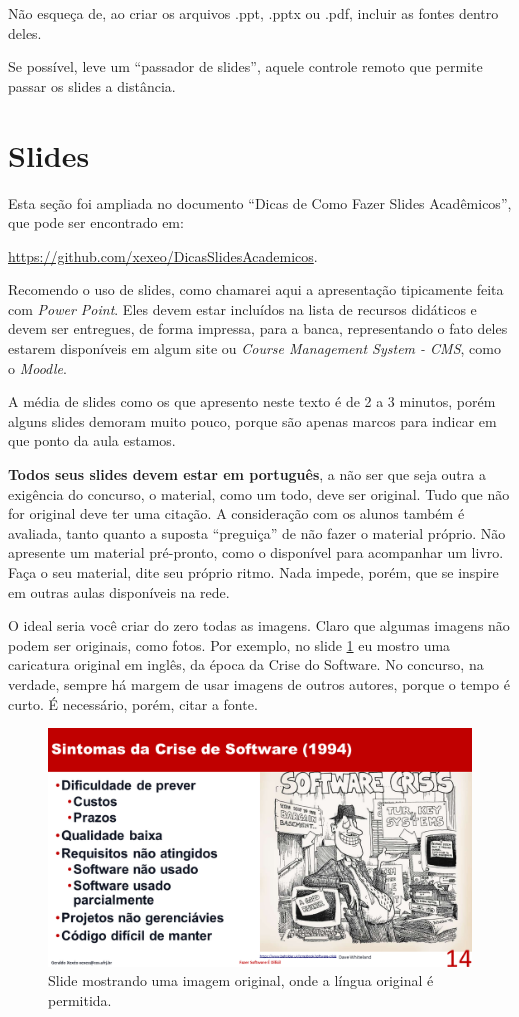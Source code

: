 \documentclass{article}
\def\tam{0.6}
\begin{document}
Não esqueça de, ao criar os arquivos .ppt, .pptx ou .pdf, incluir as fontes dentro deles.

Se possível, leve um ``passador de slides'', aquele controle remoto que permite passar os slides a distância.

\section{Slides}

Esta seção foi ampliada no documento ``Dicas de Como Fazer Slides Acadêmicos'', que pode ser encontrado em:

\url{https://github.com/xexeo/DicasSlidesAcademicos}.

Recomendo o uso de slides, como chamarei aqui a apresentação tipicamente feita com \textit{Power Point}. Eles devem estar incluídos na lista de recursos didáticos e devem ser entregues, de forma impressa, para a banca, representando o fato deles estarem disponíveis em algum site ou \textit{Course Management System - CMS}, como o \textit{Moodle}.

A média de slides como os que apresento neste texto é de 2 a 3 minutos, porém alguns slides demoram muito pouco, porque são apenas marcos para indicar em que ponto da aula estamos.

\textbf{Todos seus slides devem estar em português}, a não ser que seja outra a exigência do concurso, o material, como um todo, deve ser original. Tudo que não for original deve ter uma citação. A consideração com os alunos também é avaliada, tanto quanto a suposta ``preguiça'' de não fazer o material próprio. Não apresente um material pré-pronto, como o disponível para acompanhar um livro. Faça o seu material, dite seu próprio ritmo. Nada impede, porém, que se inspire em outras aulas disponíveis na rede.

O ideal seria você criar do zero todas as imagens. Claro que algumas imagens não podem ser originais, como fotos. Por exemplo, no slide \ref{fig:crisis} eu mostro uma caricatura original em inglês, da época da Crise do Software. No concurso, na verdade, sempre há  margem de usar imagens de outros autores, porque o tempo é curto. É necessário, porém, citar a fonte.

\begin{figure}[!htb]
    \centering
    \includegraphics[width=\tam\linewidth]{imagens/crisis.png}
    \caption{Slide mostrando uma imagem original, onde a língua original é permitida.}
    \label{fig:crisis}
\end{figure}
\end{document}
